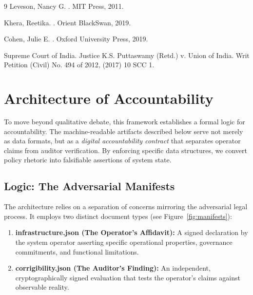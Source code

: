 \documentclass{article}
\begin{document}
\begin{thebibliography}{9}
Leveson, Nancy G.
.
\newblock MIT Press, 2011.

Khera, Reetika.
.
\newblock Orient BlackSwan, 2019.

Cohen, Julie E.
.
\newblock Oxford University Press, 2019.

Supreme Court of India.
\newblock Justice K.S. Puttaswamy (Retd.) v. Union of India.
\newblock Writ Petition (Civil) No. 494 of 2012, (2017) 10 SCC 1.

\end{thebibliography}

\appendix

\section{Architecture of Accountability}
\label{appendix:architecture}

To move beyond qualitative debate, this framework establishes a formal logic for accountability. The machine-readable artifacts described below serve not merely as data formats, but as a \textit{digital accountability contract} that separates operator claims from auditor verification. By enforcing specific data structures, we convert policy rhetoric into falsifiable assertions of system state.

\subsection{Logic: The Adversarial Manifests}

The architecture relies on a separation of concerns mirroring the adversarial legal process. It employs two distinct document types (see Figure~\ref{fig:manifests}):

\begin{enumerate}
    \item \textbf{infrastructure.json (The Operator's Affidavit):} A signed declaration by the system operator asserting specific operational properties, governance commitments, and functional limitations.
    \item \textbf{corrigibility.json (The Auditor's Finding):} An independent, cryptographically signed evaluation that tests the operator's claims against observable reality.
\end{enumerate}
\end{document}

